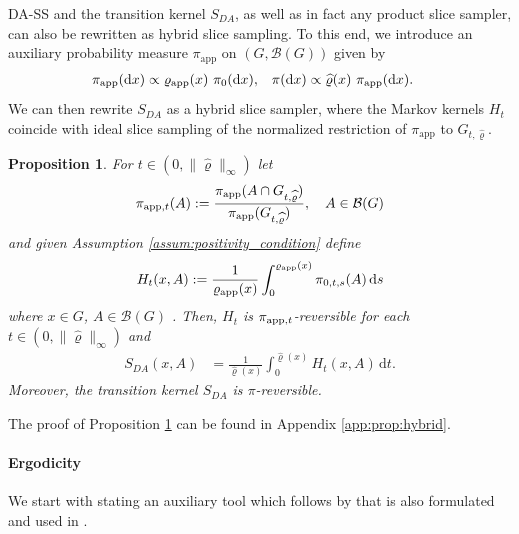 \documentclass[sn-mathphys-num]{sn-jnl}%
\theoremstyle{thmstyleone}%
\newtheorem{proposition}[theorem]{Proposition}%
\theoremstyle{thmstyletwo}%
\theoremstyle{thmstylethree}%
\newcommand{\rhoapp}{\varrho_{{\rm app}}}
\newcommand{\piapp}{\pi_{\text{app}}}
\newcommand{\change}[1]{\bgroup\color{black}#1\egroup}    %
\begin{document}
DA-SS and the transition kernel $S_{DA}$, as well as in fact any product slice sampler, can also be rewritten as hybrid slice sampling. 
To this end, we introduce an auxiliary probability measure $\piapp$ on $(G, \mathcal B(G))$ given by
\begin{align}\label{PMLR:distribution:factorization}
	\piapp(\text{d} x) 
    & \propto \rhoapp(x)\ \pi_0(\text{d}x),
    & \pi(\mathrm{d}x)
	& \propto \widehat{\varrho}(x) \ \pi_{\text{app}}(\mathrm{d}x).
\end{align} 
We can then rewrite $S_{DA}$ as a hybrid slice sampler, where the Markov kernels $H_t$ coincide with ideal slice sampling of the normalized restriction of $\piapp$ to $G_{t,\widehat{\varrho}}$.
\begin{proposition}\label{PMLR:prop:hybrid}
	For $t \in (0, \|\widehat\varrho\|_\infty)$ let
	\begin{align*}
		\pi_{{\rm app},t}(A):=\frac{\pi_{{\rm app}}(A \cap G_{t,\widehat{\varrho}})}{\pi_{{\rm app}}(G_{t,\widehat{\varrho}})}, \quad A\in\mathcal{B}(G) 	
	\end{align*}
	and \change{given Assumption \ref{assum:positivity_condition}} define 
	\begin{align}\label{eq:S_DA_Ht}
		H_t(x,A):=\frac{1}{\rhoapp(x)} \int_0^{\rhoapp(x)} \pi_{0,t,s}(A)  \, \mathrm{d}s
	\end{align}
	where $x\in G$, $A\in\mathcal{B}(G)$ .
	Then, $H_t$ is $\pi_{{\rm app},t}$-reversible for each $t \in (0, \|\widehat\varrho\|_\infty)$ and
	\begin{align}\label{eq:S_DA_hybrid}
		S_{DA}(x,A) 
		& = \frac{1}{\widehat\varrho(x)} \int_{0}^{\widehat\varrho(x)}
		H_t(x,A) \, \mathrm{d}t. 
	\end{align}  
Moreover, the transition kernel $S_{DA}$ is $\pi$-reversible.
\end{proposition}

\noindent The proof of Proposition \ref{PMLR:prop:hybrid} can be found in Appendix \ref{app:prop:hybrid}. 

\paragraph{Ergodicity}

We start with stating an auxiliary tool which follows by \cite[Corollary 1 and Theorem 1]{Tierney1994} that is also formulated and used in \cite[Section~1]{Schaer2025}. 
\end{document}
